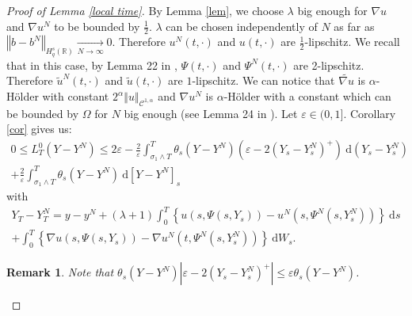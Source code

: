 \documentclass[11pt]{article}
\newtheorem{rem}{Remark}
\newcommand{\norme}[1]{\left\Vert #1\right\Vert}
\newcommand{\R}{\mathbb{R}}
\newcommand{\di}{\mathrm{d}}
\begin{document}
\begin{proof}[Proof of Lemma \ref{local time}]
    By Lemma \ref{lem}, we choose $\lambda$ big enough for $\nabla u$ and $\nabla u^N$ to be bounded by $\frac{1}{2}$. $\lambda$ can be chosen independently of $N$ as far as $\norme{b - b^N}_{H_q^s(\R)} \underset{N\rightarrow\infty}{\longrightarrow} 0$. Therefore $u^N(t,\cdot)$ and $u(t,\cdot)$ are $\frac{1}{2}$-lipschitz. We recall that in this case, by Lemma 22 in \cite{Fla-Iss-Rus-2017}, $\Psi(t,\cdot)$ and $\Psi^N(t,\cdot)$ are 2-lipschitz. Therefore $\widetilde{u}^N(t,\cdot)$ and $\widetilde{u}(t,\cdot)$ are $1$-lipschitz. We can notice that $\widetilde{\nabla u}$ is $\alpha$-Hölder with constant $2^\alpha\norme{u}_{\mathcal{C}^{1,\alpha}}$ and $\nabla u^N$ is $\alpha$-Hölder with a constant which can be bounded by $\Omega$ for $N$ big enough (see Lemma 24 in \cite{Fla-Iss-Rus-2017}).
    Let $\varepsilon\in(0,1]$. Corollary \ref{cor} gives us:    
    \begin{multline*}
    0\leq L^0_T(Y-Y^N) \leq 2\varepsilon - \frac{2}{\varepsilon}\int_{\sigma_1\wedge T}^T \theta_s(Y-Y^N) \left(\varepsilon - 2{(Y_s-Y_s^N)^+}\right)\ \di \left(Y_s-Y_s^N\right)\\
    +\frac{2}{\varepsilon}\int_{\sigma_1\wedge T}^T \theta_s(Y-Y^N) \ \di\left[Y-Y^N\right]_s
    \end{multline*}    
    with
    \begin{multline*}    
    Y_T-Y_T^N = y-y^N + (\lambda + 1 )\int_0^T\left\{u\left(s,\Psi\left(s,Y_s\right)\right)-u^N\left(s,\Psi^N\left(s,Y_s^N\right)\right)\right\}\ \di s\\ + \int_0^T\left\{\nabla u\left(s,\Psi\left(s,Y_s\right)\right)-\nabla u^N\left(t,\Psi^N\left(s,Y_s^N\right)\right)\right\}\ \di W_s.
    \end{multline*}    
    \begin{rem}
        Note that $\theta_s(Y-Y^N) \left|\varepsilon - 2{(Y_s-Y_s^N)^+}\right|\leq \varepsilon\theta_s(Y-Y^N)$.
    \end{rem}    
    

\end{proof}
\end{document}
